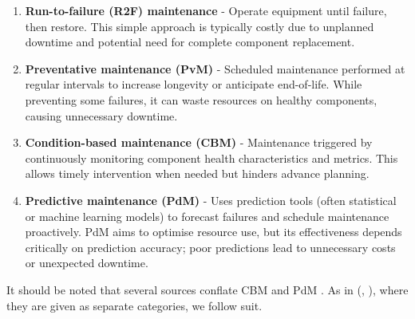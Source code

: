 \documentclass[10pt,oneside]{report}
\renewcommand{\citet}[1]{\citeauthor{#1}, \citeyear{#1}}
\begin{document}
\begin{enumerate}
    \item{\textbf{Run-to-failure (R2F) maintenance} - Operate equipment until failure, then restore. This simple approach is typically costly due to unplanned downtime and potential need for complete component replacement.}
    \item{\textbf{Preventative maintenance (PvM)} - Scheduled maintenance performed at regular intervals to increase longevity or anticipate end-of-life. While preventing some failures, it can waste resources on healthy components, causing unnecessary downtime.}
    \item{\textbf{Condition-based maintenance (CBM)} - Maintenance triggered by continuously monitoring component health characteristics and metrics. This allows timely intervention when needed but hinders advance planning.}
    \item{\textbf{Predictive maintenance (PdM)} - Uses prediction tools (often statistical or machine learning models) to forecast failures and schedule maintenance proactively. PdM aims to optimise resource use, but its effectiveness depends critically on prediction accuracy; poor predictions lead to unnecessary costs or unexpected downtime.}
\end{enumerate}
It should be noted that several sources conflate CBM and PdM \cite{mobley2002introduction}. As in (\citet{susto2012predictive}), where they are given as separate categories, we follow suit. \\ 
\end{document}
